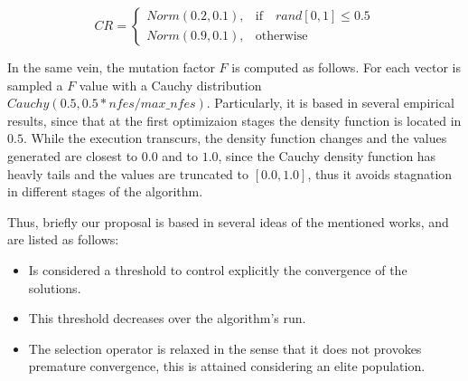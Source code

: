 \begin{equation} \label{eqn:cr}
CR = 
\begin{cases}
     Norm(0.2, 0.1),& \text{if} \quad rand[0,1] \leq 0.5  \\
     Norm(0.9, 0.1),              & \text{otherwise}
\end{cases}
\end{equation}


In the same vein, the mutation factor $F$ is computed as follows.
%
For each vector is sampled a $F$ value with a Cauchy distribution $Cauchy(0.5, 0.5*nfes/max\_nfes)$.
%
Particularly, it is based in several empirical results, since that at the first optimizaion stages the density function is located in $0.5$.
%
While the execution transcurs, the density function changes and the values generated are closest to $0.0$ and to $1.0$, since the Cauchy density function has heavly tails and the values are truncated to $[0.0, 1.0]$, thus it avoids stagnation in different stages of the algorithm.
%
%


Thus, briefly our proposal is based in several ideas of the mentioned works, and are listed as follows:
\begin{itemize}
\item Is considered a threshold to control explicitly the convergence of the solutions.
\item This threshold decreases over the algorithm's run.
\item The selection operator is relaxed in the sense that it does not provokes premature convergence, this is attained considering an elite population. 
\end{itemize}


